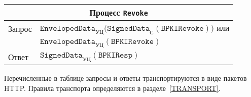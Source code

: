 \begin{table}[bht]
\begin{tabular}{|l|l|}
\hline                                     
\hline
\multicolumn{2}{|c|}{Процесс \texttt{Revoke}}\\
\hline
\hline
\rule{0pt}{15pt}
Запрос &
$\texttt{EnvelopedData}_{\text{УЦ}}
\bigl(\texttt{SignedData}_{\text{С}}(\texttt{BPKIRevoke})\bigr)$ или\\
&
$\texttt{EnvelopedData}_{\text{УЦ}}(\texttt{BPKIRevoke})$\\[3pt]
\hline                                      
%
\rule{0pt}{15pt}
Ответ &
$\texttt{SignedData}_{\text{УЦ}}(\texttt{BPKIResp})$\\[3pt]
\hline                                     
\end{tabular}
\end{table}

Перечисленные в таблице запросы и ответы транспортируются в виде пакетов 
HTTP. Правила транспорта определяются в разделе~\ref{TRANSPORT}.

